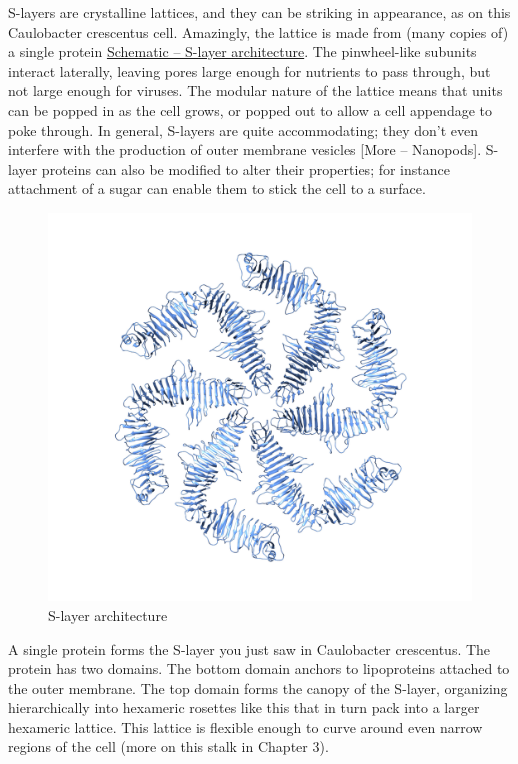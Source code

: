 \documentclass[]{tufte-book}
\begin{document}
S-layers are crystalline lattices, and they can be striking in
appearance, as on this Caulobacter crescentus cell. Amazingly, the
lattice is made from (many copies of) a single protein
\protect\hyperlink{fig:2-6-1}{Schematic -- S-layer architecture}. The
pinwheel-like subunits interact laterally, leaving pores large enough
for nutrients to pass through, but not large enough for viruses. The
modular nature of the lattice means that units can be popped in as the
cell grows, or popped out to allow a cell appendage to poke through. In
general, S-layers are quite accommodating; they don't even interfere
with the production of outer membrane vesicles {[}More -- Nanopods{]}.
S-layer proteins can also be modified to alter their properties; for
instance attachment of a sugar can enable them to stick the cell to a
surface.

\begin{figure}
\includegraphics{img/02_schematic/2_6_1_SLayerTop} \caption[S-layer architecture]{S-layer architecture}\label{fig:2-6-1}
\end{figure}

A single protein forms the S-layer you just saw in Caulobacter
crescentus. The protein has two domains. The bottom domain anchors to
lipoproteins attached to the outer membrane. The top domain forms the
canopy of the S-layer, organizing hierarchically into hexameric rosettes
like this that in turn pack into a larger hexameric lattice. This
lattice is flexible enough to curve around even narrow regions of the
cell (more on this stalk in Chapter 3).
\end{document}

